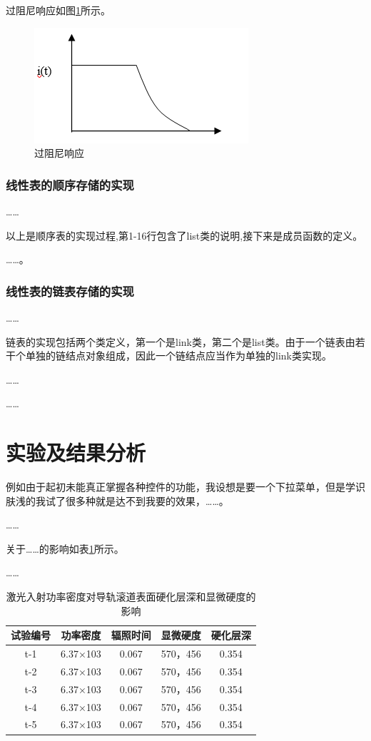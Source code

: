 \documentclass[supercite]{upcthesis}
\begin{document}
过阻尼响应如图\ref{guozuni}所示。
\begin{figure}[htbp]
\centering
\includegraphics{./figure/guozuni.png}
\caption{过阻尼响应}
\label{guozuni}
\end{figure}
\subsubsection{线性表的顺序存储的实现}
……

以上是顺序表的实现过程,第1-16行包含了list类的说明,接下来是成员函数的定义。

……。
\subsubsection{线性表的链表存储的实现}
……

链表的实现包括两个类定义，第一个是link类，第二个是list类。由于一个链表由若干个单独的链结点对象组成，因此一个链结点应当作为单独的link类实现。

……

……

\section{实验及结果分析}
例如由于起初未能真正掌握各种控件的功能，我设想是要一个下拉菜单，但是学识肤浅的我试了很多种就是达不到我要的效果，……。

……

关于……的影响如表\ref{data_table}所示。

……

\begin{table}[htbp]
	\small
	\newcommand{\tabincell}[2]{\begin{tabular}{@{}#1@{}}#2\end{tabular}} 
	\centering
	\caption{激光入射功率密度对导轨滚道表面硬化层深和显微硬度的影响}
	\begin{tabular}{ccccc}
		\toprule
		试验编号 & 功率密度 & 辐照时间 & 显微硬度 	& 硬化层深\\ \midrule
		t-1	&6.37×103	&0.067	&570，456	&0.354\\
		t-2	&6.37×103	&0.067	&570，456	&0.354\\
		t-3	&6.37×103	&0.067	&570，456	&0.354\\
		t-4	&6.37×103	&0.067	&570，456	&0.354\\
		t-5	&6.37×103	&0.067	&570，456	&0.354\\ \bottomrule
	\end{tabular}
	\label{data_table}
\end{table}
\end{document}
